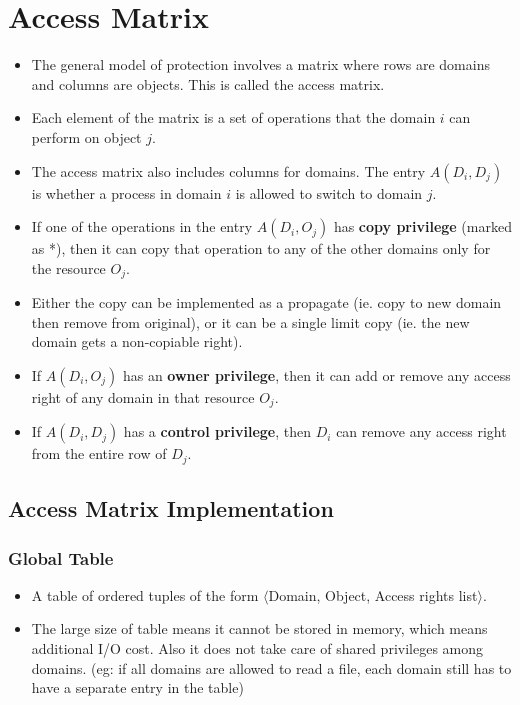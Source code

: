 \documentclass{article}
\theoremstyle{plain}
\theoremstyle{definition}
\begin{document}
\section{Access Matrix}
\begin{itemize}
    \item The general model of protection involves a matrix where rows are domains and columns are objects. This is called the access matrix. 
    
    \item Each element of the matrix is a set of operations that the domain $i$ can perform on object $j$. 
    
    \item The access matrix also includes columns for domains. The entry $A(D_i, D_j)$ is whether a process in domain $i$ is allowed to switch to domain $j$. 
    
    \item If one of the operations in the entry $A(D_i, O_j)$ has \textbf{copy privilege} (marked as *), then it can copy that operation to any of the other domains only for the resource $O_j$. 
    
    \item Either the copy can be implemented as a propagate (ie. copy to new domain then remove from original), or it can be a single limit copy (ie. the new domain gets a non-copiable right).
    
    \item If $A(D_i, O_j)$ has an \textbf{owner privilege}, then it can add or remove any access right of any domain in that resource $O_j$. 
    
    \item If $A(D_i, D_j)$ has a \textbf{control privilege}, then $D_i$ can remove any access right from the entire row of $D_j$.
\end{itemize}

\subsection{Access Matrix Implementation}
\subsubsection{Global Table}
\begin{itemize}
    \item A table of ordered tuples of the form $\langle$Domain, Object, Access rights list$\rangle$. 
    
    \item The large size of table means it cannot be stored in memory, which means additional I/O cost. Also it does not take care of shared privileges among domains. (eg: if all domains are allowed to read a file, each domain still has to have a separate entry in the table)
\end{itemize}
\end{document}
